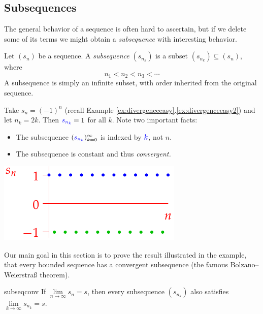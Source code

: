 \clearpage

\iffalse

\subsection{Subsequences}\label{sec:subseq}

The general behavior of a sequence is often hard to ascertain, but if we delete some of its terms we might obtain a \emph{subsequence} with interesting behavior.

\begin{defn}{}{}
	Let $(s_n)$ be a sequence. A \emph{subsequence} $(s_{n_k})$ is a subset $(s_{n_k})\subseteq (s_n)$, where 
	\[n_1<n_2<n_3<\cdots\]
	A subsequence is simply an infinite subset, with order inherited from the original sequence.
\end{defn}

\begin{example}[lower separated=false, sidebyside, sidebyside align=top seam, sidebyside gap=0pt, righthand width=0.38\linewidth]{}{}
	Take $s_n=(-1)^n$ (recall Example \ref*{ex:divergenceeasy}.\ref{ex:divergenceeasy2}) and let $n_k=2k$. Then $\textcolor{blue}{s_{n_k}}=1$ for all $k$. Note two important facts:
	\begin{itemize}
	  \item The subsequence $(\textcolor{blue}{s_{n_k}})_{k=0}^\infty$ is indexed by $\textcolor{blue}{k}$, not $n$.
	  \item The subsequence is constant and thus \emph{convergent.}
	\end{itemize} 
	\tcblower
	\hfill\includegraphics{divergent3}
\end{example}

Our main goal in this section is to prove the result illustrated in the example, that every bounded sequence has a convergent subsequence (the famous Bolzano--Weierstraß theorem).


\begin{lemm}{}{subseqconv}
	If $\lim\limits_{n\to\infty} s_n=s$, then every subsequence $(s_{n_k})$ also satisfies $\lim\limits_{k\to\infty} s_{n_k}=s$.\vspace{-3pt}
\end{lemm}

